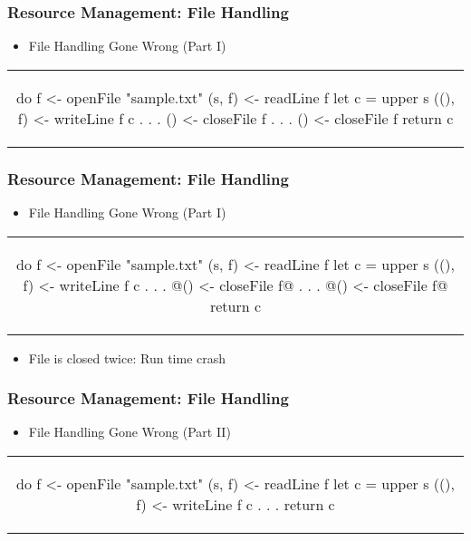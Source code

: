 \begin{frame}[fragile]
  \frametitle{Resource Management: File Handling}
  \begin{center}
    \begin{itemize}
    \item File Handling Gone Wrong (Part I)
    \end{itemize}
    \begin{tabular}[h]{c}
    \begin{haskell}
      do f  <- openFile "sample.txt"
         (s, f)  <- readLine f
         let c = upper s
         ((), f) <- writeLine f c
              .
              .
              .
         () <- closeFile f
              .
              .
              .
         () <- closeFile f
         return c
    \end{haskell}
    \end{tabular}
  \end{center}
\end{frame}

\begin{frame}[fragile]
  \frametitle{Resource Management: File Handling}
  \begin{center}
    \begin{itemize}
    \item File Handling Gone Wrong (Part I)
    \end{itemize}
    \begin{tabular}[h]{c}
    \begin{haskell}
      do f  <- openFile "sample.txt"
         (s, f)  <- readLine f
         let c = upper s
         ((), f) <- writeLine f c
              .
              .
              .
        @() <- closeFile f@
              .
              .
              .
        @() <- closeFile f@
         return c
    \end{haskell}
    \end{tabular}
    \begin{itemize}
    \item File is closed twice: Run time crash
    \end{itemize}
  \end{center}
\end{frame}

\begin{frame}[fragile]
  \frametitle{Resource Management: File Handling}
  \begin{center}

  \begin{itemize}
  \item File Handling Gone Wrong (Part II)
  \end{itemize}
  \begin{tabular}[h]{c}
    \begin{haskell}
    do f  <- openFile "sample.txt"
       (s, f)  <- readLine f
       let c = upper s
       ((), f) <- writeLine f c
           .
           .
           .
       return c
     \end{haskell}
  \end{tabular}

\end{center}
\end{frame}

